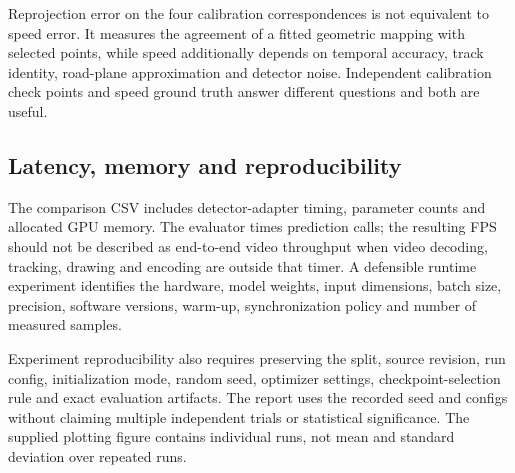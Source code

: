 Reprojection error on the four calibration correspondences is not equivalent to speed error. It measures the agreement of a fitted geometric mapping with selected points, while speed additionally depends on temporal accuracy, track identity, road-plane approximation and detector noise. Independent calibration check points and speed ground truth answer different questions and both are useful.

\subsection{Latency, memory and reproducibility}
The comparison CSV includes detector-adapter timing, parameter counts and allocated GPU memory. The evaluator times prediction calls; the resulting FPS should not be described as end-to-end video throughput when video decoding, tracking, drawing and encoding are outside that timer. A defensible runtime experiment identifies the hardware, model weights, input dimensions, batch size, precision, software versions, warm-up, synchronization policy and number of measured samples.

Experiment reproducibility also requires preserving the split, source revision, run config, initialization mode, random seed, optimizer settings, checkpoint-selection rule and exact evaluation artifacts. The report uses the recorded seed and configs without claiming multiple independent trials or statistical significance. The supplied plotting figure contains individual runs, not mean and standard deviation over repeated runs.
